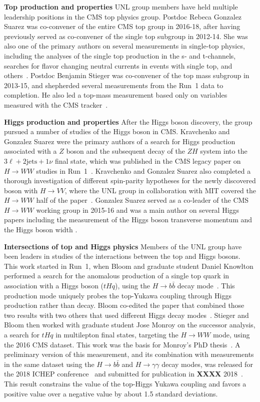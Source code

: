 {\bf Top production and properties} 
UNL group members have held multiple leadership positions in the CMS top
physics group.  Postdoc Rebeca Gonzalez Suarez was co-convener of the entire CMS top group
in 2016-18, after having previously served as co-convener of the single top
subgroup in 2012-14.  She was also one of the primary authors on several
measurements in single-top physics, including the analyses of the single
top production in the s- and t-channels, searches for flavor changing
neutral currents in events with single top, and
others~\cite{bib:single-top-papers}.  Postdoc Benjamin Stieger was co-convener of the top
mass subgroup in 2013-15, and shepherded several measurements from the
Run~1 data to completion.  He also led a top-mass measurement based only on
variables measured with the CMS tracker~\cite{bib:tracker-top-mass}.

{\bf Higgs production and properties}
After the Higgs boson discovery, the group pursued a number of studies of the Higgs boson in CMS. Kravchenko and Gonzalez Suarez were the primary authors of a search for Higgs production associated with a $Z$ boson and the subsequent decay of the $ZH$ system into the $3\ell+2\text{jets}+1\nu$ final state,  which was published in the CMS legacy paper on $H\rightarrow WW$ studies in Run~1~\cite{bib:HWWlegacy}. Kravchenko and Gonzalez Suarez also completed a thorough investigation of different spin-parity hypotheses for the newly discovered boson with $H\rightarrow VV$, where the UNL group in collaboration with MIT covered the $H\rightarrow WW$ half of the paper~\cite{bib:higgs-spin-parity}. Gonzalez Suarez served as a co-leader of the CMS $H\to WW$ working group in 2015-16 and was a main author on several Higgs papers including the measurement of the Higgs boson transverse momentum \cite{bib:HWW-pT} and the Higgs boson width \cite{bib:Higgs-width}.

{\bf Intersections of top and Higgs physics} Members of the UNL group have been leaders in studies of the interactions between the top and Higgs bosons.  This work started in Run~1, when Bloom and graduate student Daniel Knowlton performed a search for the anomalous production of a single top quark in association with a Higgs boson ($tHq$), using the $H \to b\bar{b}$ decay mode~\cite{bib:tHqbbPAS}.  This production mode uniquely probes the top-Yukawa coupling through Higgs production rather than decay.  Bloom co-edited the paper that combined those two results with two others that used different Higgs decay modes~\cite{bib:tHqRun1}.  Stieger and Bloom then worked with graduate student Jose Monroy on the successor analysis, a search for $tHq$ in multilepton final states, targeting the $H \to WW$ mode, using the 2016 CMS dataset.  This work was the basis for Monroy's PhD thesis~\cite{bib:monroy_thesis}.  A preliminary version of this measurement, and its combination with measurements in the same dataset using the $H\to b\bar{b}$ and $H \to \gamma\gamma$ decay modes, was released for the 2018 ICHEP conference~\cite{bib:tHqRun2PAS} and submitted for publication in {\bf XXXX} 2018~\cite{bib:tHqRun2}.  This result constrains the value of the top-Higgs Yukawa coupling and favors a positive value over a negative value by about 1.5 standard deviations.

